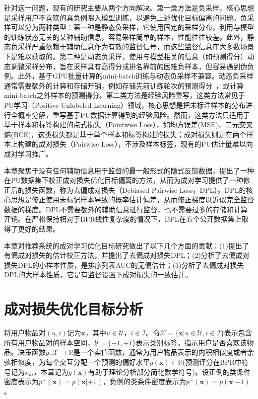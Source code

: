 针对这一问题，现有的研究主要从两个方向解决。第一类方法是负采样\cite{Steffen:2014:WSDM,Zhang:2013:SIGIR,Ding:2020:NIPS,Park:2019:WWW,Huang:2021:KDD,Ding:2019:IJCAI,Yang:2020:KDD}，核心思想是采样用户不喜欢的真负例喂入模型训练，以避免上述优化目标偏离的问题。负采样可以分为两种类型：第一种是静态负采样，它使用固定的采样分布，利用与模型的训练状态无关的某种辅助信息，容易采样简单的样本，性能往往较差。此外，静态负采样严重依赖于辅助信息作为有效的监督信号，而这些监督信息在大多数场景下是难以获取的。第二种是动态负采样，使用与模型相关的信息（如预测得分）动态调整采样分布，旨在采样具有高得分或排名靠前的困难负样本，但容易遇到伪负例。此外，基于GPU批量计算的mini-batch训练与动态负采样不兼容。动态负采样通常需要额外的计算和存储开销，例如存储先前训练轮次的预测得分~\cite{Ding:2020:NIPS}，或计算mini-batch之外样本的预测得分\cite{Zhang:2013:SIGIR,Steffen:2014:WSDM}。第二类方法是经验风险重写\cite{Su:2021:IJCAI,Christoffel:2016:ACML,Jain:2016:NIPS,Du:2015:ICML,Du:2014:NIPS}，这类方法常见于PU学习（Positive-Unlabeled Learning）领域\cite{Jessa:2020:ML}，核心思想是把未标注样本的分布进行全概率分解，重写基于PU数据计算得到的经验风险。然而，这类方法只适用于基于样本和标签构建的点式损失（Pointwise Loss），如均方误差(MSE)，二元交叉熵(BCE)，这类损失都是基于单个样本和标签构建的损失；成对损失则是在两个样本上构建的成对损失（Pairwise Loss），不涉及样本标签，现有的PU估计量难以向成对学习推广。

本章聚焦于没有任何辅助信息用于监督的最一般形式的隐式反馈数据，提出了一种在PU数据集下校正成对损失优化目标偏离的方法，从而为成对学习提供了一种修正后的损失函数，称为去偏成对损失（Debiased Pairwise Loss，DPL）。DPL的核心思想是修正使用未标记样本导致的概率估计偏差，从而修正梯度以近似完全监督数据的梯度。DPL不需要额外的辅助信息进行监督，也不需要过多的存储和计算开销。在严格保持相对于BPR线性复杂度的情况下，DPL在五个公开数据集上取得了更好的结果。

本章对推荐系统的成对学习优化目标研究做出了以下几个方面的贡献：(1)提出了有偏成对损失的估计校正方法，并提出了去偏成对损失DPL；(2)分析了去偏成对损失DPL的小样本性质，是排序列表AUC的无偏估计；(3)分析了去偏成对损失DPL的大样本性质，它是有监督设置下成对损失的一致估计。

\section{成对损失优化目标分析}\label{2sec:2}
将用户物品对$(u,i)$记为$\mathbf{x}$，其中$u\in \mathcal{U}$，$i\in \mathcal{I}$。令$\mathcal{X}= \{\mathbf x|u\in \mathcal{U}, i\in \mathcal{I}\}$表示包含所有用户物品对的样本空间，$\mathcal{Y} =\{-1,+1\}$表示类别标签，指示用户是否喜欢该物品。决策函数$g:\mathcal{X} \rightarrow \mathbb{R}$是一个实值函数，通常为用户物品表示的内积相似度或者余弦相似度，为每个交互分配一个预测的偏好水平$g(\mathbf x) \in \mathbb{R}$(预测评分在BPR中符号记为$\hat{x}_{ui}$，本章记为$g(\mathbf x)$有助于理论分析部分简化数学符号)。设正例的类条件密度表示为$p^+(\mathbf x) = p(\mathbf x|+1)$，负例的类条件密度表示为$p^-(\mathbf x) = p(\mathbf x|-1)$。

